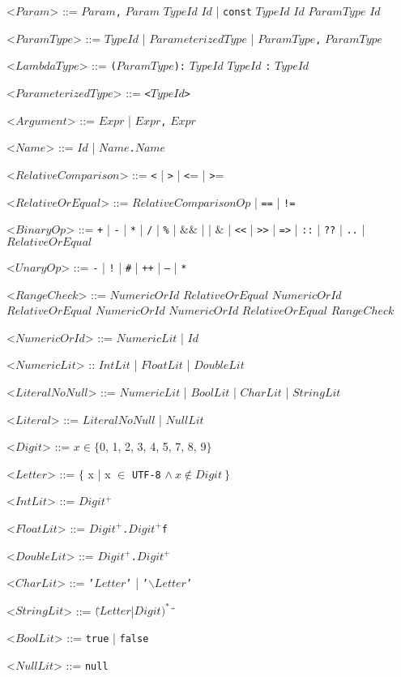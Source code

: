 \documentclass{article}
\newcommand{\gtext}[1]{<$#1$>}
\newcommand{\glit}[1]{\texttt{#1}}
\begin{document}
\begin{grammar}
	\newpage	
	
	\gtext{Param} ::= $Param$\glit{,} $Param$
	\alt $TypeId$ $Id$ | \glit{const} $TypeId$ $Id$
	\alt $ParamType$ $Id$
	
	\gtext{ParamType} ::= $TypeId$ | $ParameterizedType$ | $ParamType$\glit{,} $ParamType$

	\gtext{LambdaType} ::= \glit{(}$ParamType$\glit{):} $TypeId$
	\alt $TypeId$ \glit{:} $TypeId$
	
	\gtext{ParameterizedType} ::= \glit{\textless}$TypeId$\glit\textgreater{}	
	
	\gtext{Argument} ::= $Expr$ | $Expr$\glit{,} $Expr$
	
	\gtext{Name} ::= $Id$ | $Name$\glit{.}$Name$	
	
	\gtext{RelativeComparison} ::=  \glit{\textless} | \glit{\textgreater} | \glit{\textless}= | \glit{\textgreater}=
	
	\gtext{RelativeOrEqual} ::= $RelativeComparisonOp$ | \glit{==} | \glit{!=}
	
	\gtext{BinaryOp} ::= \glit{+} | \glit{-} | \glit{*} | \glit{/} | \glit{\%} 
	\glit{\textbar\textbar} | $\&\&$ | \glit{\textbar} | 
	\alt  $\&$ | \glit{\textless\textless} | \glit{\textgreater\textgreater} | \glit{=>} | \glit{::} | \glit{??} | \glit{..} | 
	\alt  $RelativeOrEqual$
	
	\gtext{UnaryOp} ::= \glit{-} | \glit{!} | \glit{\#} | \glit{++} | \glit{--} | \glit{*}

	\gtext{RangeCheck} ::= $NumericOrId$ $RelativeOrEqual$ $NumericOrId$ $RelativeOrEqual$ $NumericOrId$
	\alt $NumericOrId$ $RelativeOrEqual$ $RangeCheck$
	
	\gtext{NumericOrId} ::= $NumericLit$ | $Id$
	
	\gtext{NumericLit} :: $IntLit$ | $FloatLit$ | $DoubleLit$
	
	\gtext{LiteralNoNull}	::= $NumericLit$ | $BoolLit$ | $CharLit$ | $StringLit$
	
	\gtext{Literal}	::= $LiteralNoNull$ | $NullLit$
	
	\gtext{Digit} ::= $x \in \{$0, 1, 2, 3, 4, 5, 7, 8, 9$\}$
	
	\gtext{Letter} ::= $\{$ x | x $\in$ \glit{UTF-8} $\land \ x \notin Digit \ \}$
	
	\gtext{IntLit} ::= $Digit^+$
	
	\gtext{FloatLit} ::= $Digit^+$\glit{.}$Digit^+$\glit{f}
	
	\gtext{DoubleLit} ::= $Digit^+$\glit{.}$Digit^+$

	\gtext{CharLit} ::= \glit{'}$Letter$\glit{'} | \glit{'$\backslash$}$Letter$\glit{'}
	
	\gtext{StringLit} ::= \glit{\"}$(Letter$|$Digit)^*$\glit{\"}	
	
	\gtext{BoolLit} ::= \glit{true} | \glit{false}
	
	\gtext{NullLit} ::= \glit{null}

\end{grammar}
\end{document}
